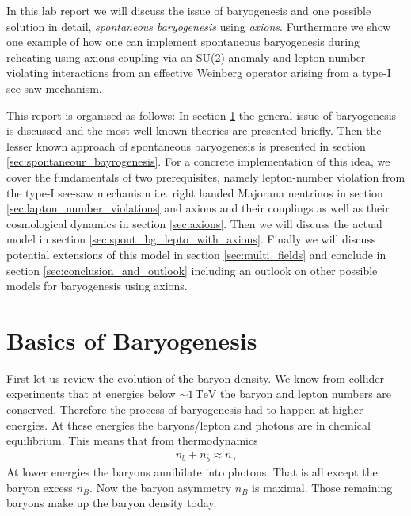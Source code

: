 \documentclass[13pt,a4paper,twoside,titlepage]{article}
\begin{document}
\noindent
In this lab report we will discuss the issue of baryogenesis and one possible solution in detail, \emph{spontaneous baryogenesis} using \emph{axions}. Furthermore we show one example of how one can implement spontaneous baryogenesis during reheating using axions coupling via an SU(2) anomaly and lepton-number violating interactions from an effective Weinberg operator arising from a type-I see-saw mechanism.

\noindent
This report is organised as follows:
In section \ref{sec:baryogenesis} the general issue of baryogenesis is discussed and the most well known theories are presented briefly.
Then the lesser known approach of spontaneous baryogenesis is presented in section \ref{sec:spontaneour_bayrogenesis}.
For a concrete implementation of this idea, we cover the fundamentals of two prerequisites, namely lepton-number violation from the type-I see-saw mechanism i.e. right handed Majorana neutrinos in section \ref{sec:lapton_number_violations} and axions and their couplings as well as their cosmological dynamics in section \ref{sec:axions}. Then we will discuss the actual model in section \ref{sec:spont_bg_lepto_with_axions}.
Finally we will discuss potential extensions of this model in section \ref{sec:multi_fields} and conclude in section \ref{sec:conclusion_and_outlook} including an outlook on other possible models for baryogenesis using axions.

\section{Basics of Baryogenesis}
\label{sec:baryogenesis}

First let us review the evolution of the baryon density. We know from collider experiments that at energies below $\sim 1 \, \mathrm{TeV}$ the baryon and lepton numbers are conserved.
Therefore the process of baryogenesis had to happen at higher energies.
At these energies the baryons/lepton and photons are in chemical equilibrium.
This means that from thermodynamics
\begin{align}
\label{eq:baryon_equilibrium}
n_b + n_{\bar{b}} \approx n_\gamma
\end{align}
At lower energies the baryons annihilate into photons. That is all except the baryon excess $n_B$. Now the baryon asymmetry $n_B$ is maximal. Those remaining baryons make up the baryon density today.
\end{document}
